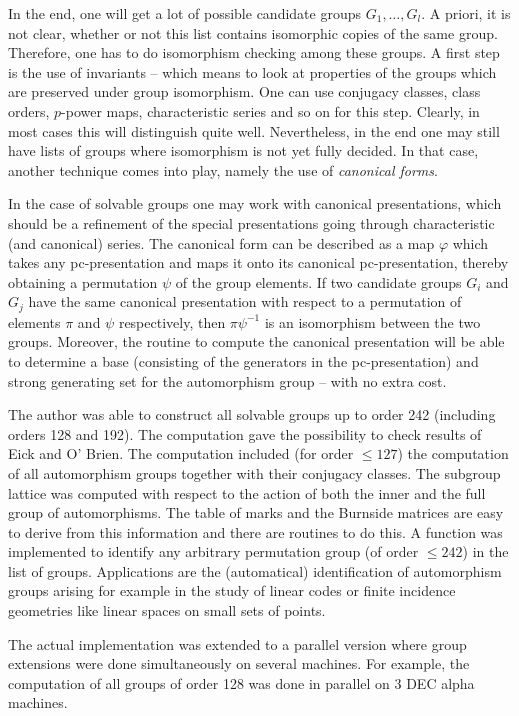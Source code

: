 \documentclass[]{article}
\begin{document}
In the end, one will get a lot of possible candidate groups 
$G_1, \ldots , G_l$. A priori, it is not clear, 
whether or not this list contains isomorphic copies of the same group. 
Therefore, one has to do isomorphism checking among these groups. 
A first step is the use of invariants -- 
which means to look at properties 
of the groups which are preserved under group isomorphism. 
One can use conjugacy classes, class orders, $p$-power maps, 
characteristic series and so on for this step. 
Clearly, in most cases this will distinguish quite well. 
Nevertheless, in the end one may still have 
lists of groups where isomorphism is not yet fully decided. 
In that case, another technique comes into play, namely the use 
of {\em canonical forms}. 

In the case of solvable groups 
one may work with canonical presentations, which 
should be a refinement of the special presentations 
going through characteristic (and canonical) series. 
The canonical form can be described as a map $\varphi$ 
which takes any pc-presentation and maps it onto its canonical 
pc-presentation, thereby obtaining a permutation $\psi$ of the 
group elements. 
If two candidate groups $G_i$ and $G_j$ have the same canonical 
presentation with respect to a permutation of elements $\pi$ 
and $\psi$ respectively, then $\pi \psi^{-1}$ is an isomorphism 
between the two groups. 
Moreover, the routine to compute the canonical presentation 
will be able to determine a base (consisting of the generators 
in the pc-presentation) and strong generating set for 
the automorphism group -- with no extra cost. 

The author was able to construct all solvable groups up to order 242 
(including orders 128 and 192). 
The computation gave the possibility to check 
results of Eick and O' Brien. 
The computation included (for order $\le 127$) the computation 
of all automorphism groups together with their conjugacy classes. 
The subgroup lattice was computed with respect to the 
action of both the inner and the full group of automorphisms. 
The table of marks and the Burnside matrices are easy to derive 
from this information and there are routines to do this.
A function was implemented to identify any arbitrary permutation 
group (of order $\le 242$) in the list of groups. 
Applications are the (automatical) identification 
of automorphism groups arising 
for example in the study of linear codes or finite 
incidence geometries like linear spaces on small sets of points.

The actual implementation was extended to a parallel version 
where group extensions were done simultaneously on several machines. 
For example, the computation of all groups of order 128 was 
done in parallel on 3 DEC alpha machines.





\end{document}
